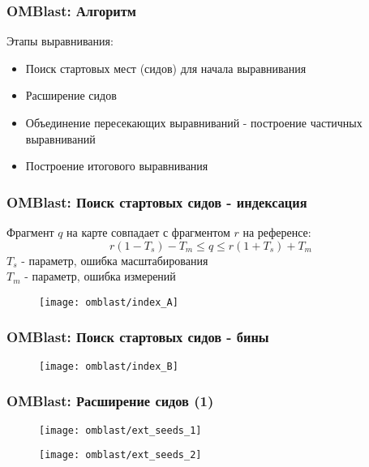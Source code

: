

\begin{frame}
\frametitle{OMBlast\nocite{omblast}: Алгоритм}

Этапы выравнивания:
\begin{itemize}
  \item Поиск стартовых мест (сидов) для начала выравнивания
  \item Расширение сидов
  \item Объединение пересекающих выравниваний - построение частичных выравниваний
  \item Построение итогового выравнивания
\end{itemize}

\end{frame}

\begin{frame}
\frametitle{OMBlast: Поиск стартовых сидов - индексация}
  Фрагмент $q$ на карте совпадает с фрагментом $r$ на референсе:
  \begin{equation*}
    r(1 - T_s) - T_m \le q \le r(1 + T_s) + T_m
  \end{equation*}
  $T_s$ - параметр, ошибка масштабирования \\
  $T_m$ - параметр, ошибка измерений \\
  \begin{figure}
    \centering
    \texttt{[image: omblast/index\_A]}
  \end{figure}
\end{frame}

\begin{frame}
\frametitle{OMBlast: Поиск стартовых сидов - бины}
  \begin{figure}
    \centering
    \texttt{[image: omblast/index\_B]}
  \end{figure}
\end{frame}

\begin{frame}
\frametitle{OMBlast: Расширение сидов (1)}
  \begin{figure}
    \centering
    \texttt{[image: omblast/ext\_seeds\_1]}
  \end{figure}
  \begin{figure}
    \centering
    \texttt{[image: omblast/ext\_seeds\_2]}
  \end{figure}
\end{frame}

